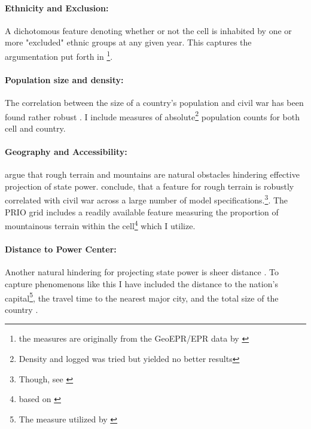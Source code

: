 \documentclass[a4paper]{article}
\begin{document}
\paragraph{Ethnicity and Exclusion:} A dichotomous feature denoting whether or not the cell is inhabited by one or more "excluded" ethnic groups at any given year. This captures the argumentation put forth in \cite{Cederman_Weidmann_Gleditsch_2011, Cederman_Gleditsch_Buhaug_2013}\footnote{the measures are originally from the GeoEPR/EPR data by \cite{Vogt_2015}}.\par

\paragraph{Population size and density:} The correlation between the size of a country's population and civil war has been found rather robust \citep{Collier_Hoeffler_1998, Fearon_Laitin_2003, Fearon_2004, Collier_Hoeffler_2004, Hegre_Sambanis_2006}. I include measures of absolute\footnote{Density and logged was tried but yielded no better results} population counts for both cell and country.\par 

\paragraph{Geography and Accessibility:} \cite{Fearon_Laitin_2003} argue that rough terrain and mountains are natural obstacles hindering effective projection of state power. \cite{Hegre_Sambanis_2006} conclude, that a feature for rough terrain is robustly correlated with civil war across a large number of model specifications.\cite[526-529]{Hegre_Sambanis_2006}\footnote{Though, see \cite{Goldstone_2010}}. The PRIO grid includes a readily available feature measuring the proportion of mountainous terrain within the cell\footnote{based on \cite{Blyth_2002}} which I utilize.\par

\paragraph{Distance to Power Center:} Another natural hindering for projecting state power is sheer distance \citep{Fearon_2004, Buhaug_Gates_Lujala_2009, Cederman_Buhaug_Roed_2009, Buhaug_2010}. To capture phenomenons like this I have included the distance to the nation's capital\footnote{The measure utilized by \cite{Buhaug_2010}}, the travel time to the nearest major city, and the total size of the country \citep{prio_code_2015}.\par
\end{document}
